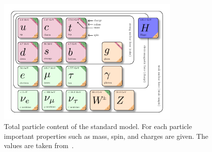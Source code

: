 \begin{figure}[!htpb]
 \centering
 \includegraphics[width=0.8\textwidth]{figures/general/SM}
 \caption{Total particle content of the standard model. For each particle important properties such as mass, spin, and charges are given. The values are taken from~\cite{PDG}.}
 \label{fig:SM}
 
\end{figure}


